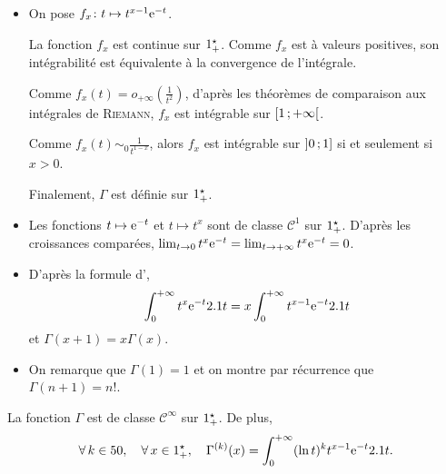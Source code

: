 \begin{demo}
\begin{itemize}
\item On pose $\fonctionligne[f_x]{t}{t^{x - 1} \e^{-t}}$.

La fonction $f_x$ est continue sur $\R_+^\star$. Comme $f_x$ est à valeurs positives, son intégrabilité est équivalente à la convergence de l'intégrale.

Comme $f_x(t) = o_{+\infty}\mathopen{}\left(\frac{1}{t^2}\right)$, d'après les théorèmes de comparaison aux intégrales de \textsc{Riemann}, $f_x$ est intégrable sur $\interfo{1}{+\infty}$.

Comme $f_x(t) \sim_0 \frac{1}{t^{1-x}}$, alors $f_x$ est intégrable sur $\interof{0}{1}$ si et seulement si $x > 0$.

Finalement, $\Gamma$ est définie sur $\R_+^\star$.

\item Les fonctions $t \mapsto \e^{-t}$ et $t \mapsto t^x$ sont de classe $\mathscr{C}^1$ sur $\R_+^\star$. D'après les croissances comparées, $\lim_{t\to0} t^x \e^{-t} = \lim_{t\to+\infty} t^x \e^{-t} = 0$. 
\item D'après la formule d',
\[
\int_0^{+\infty} t^x \e^{-t} \d t = x \int_0^{+\infty} t^{x-1} \e^{-t} \d t
\]
et $\Gamma(x+1) = x \Gamma(x)$.

\item On remarque que $\Gamma(1) = 1$ et on montre par récurrence que $\Gamma(n+1) = n!$.
\end{itemize}
\end{demo}



\begin{theo}[Régularité]
La fonction $\Gamma$ est de classe $\mathscr{C}^\infty$ sur $\Rpe$. De plus,
\[
\forall k \in \N,\quad \forall x \in \R_+^\star,\quad \Gamma^{(k)}(x) = \int_{0}^{+\infty} (\ln t)^k t^{x-1} \e^{-t} \d t.
\]
\end{theo}

